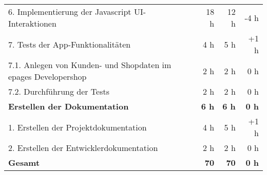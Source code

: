 \begin{tabularx}{\textwidth}{Xrrr}
\rowcolor{odd}6. Implementierung der Javascript UI-Interaktionen & 18 h  & 12 h & -4 h  \\
7. Tests der App-Funktionalitäten & 4 h & 5 h & +1 h \\
\rowcolor{odd}7.1. Anlegen von Kunden- und Shopdaten im epages Developershop & 2 h & 2 h & 0 h \\
7.2. Durchführung der Tests & 2 h & 2 h & 0 h \\
\rowcolor{heading}\textbf{Erstellen der Dokumentation} & \textbf{6 h} & \textbf{6 h} & \textbf{0 h} \\
1. Erstellen der Projektdokumentation & 4 h & 5 h & +1 h \\
\rowcolor{odd}2. Erstellen der Entwicklerdokumentation & 2 h & 2 h & 0 h  \\
\hline
\hline
\rowcolor{heading}\textbf{Gesamt} & \textbf{70} & \textbf{70} & \textbf{0 h} \\
\end{tabularx}